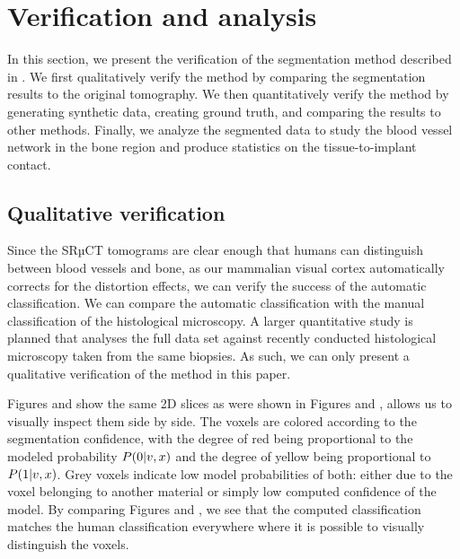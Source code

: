 \section{Verification and analysis}
\label{sec:verification}

In this section, we present the verification of the segmentation method
described in . We first qualitatively verify the method by
comparing the segmentation results to the original tomography. We then
quantitatively verify the method by generating synthetic data, creating ground
truth, and comparing the results to other methods. Finally, we analyze the
segmented data to study the blood vessel network in the bone region and produce
statistics on the tissue-to-implant contact.

\subsection{Qualitative verification}


Since the SRµCT tomograms are clear enough that humans can distinguish between
blood vessels and bone, as our mammalian visual cortex automatically corrects
for the distortion effects, we can verify the success of the automatic
classification. We can compare the automatic classification with the manual
classification of the histological microscopy. A larger quantitative study is
planned that analyses the full data set against recently conducted histological
microscopy taken from the same biopsies. As such, we can only present a
qualitative verification of the method in this paper.

Figures  and 
show the same 2D slices as were shown in Figures  and
, allows us to visually inspect them side by side. The voxels
are colored according to the segmentation confidence, with the degree of red
being proportional to the modeled probability $P\!\left(0\middle\vert v,x\right)$ and the degree
of yellow being proportional to $P\!\left(1\middle\vert v,x\right)$. Grey voxels indicate low
model probabilities of both: either due to the voxel belonging to another
material or simply low computed confidence of the model. By comparing Figures
 and , we see
that the computed classification matches the human classification everywhere
where it is possible to visually distinguish the voxels.

